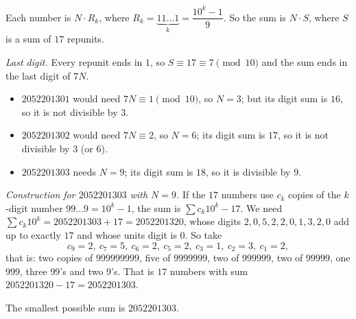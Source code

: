Each number is $N\cdot R_k$, where $R_k=\underbrace{11\ldots1}_{k}=\dfrac{10^k-1}{9}$. So the sum is $N\cdot S$, where $S$ is a sum of $17$ repunits.

\emph{Last digit.} Every repunit ends in $1$, so $S\equiv17\equiv7\pmod{10}$ and the sum ends in the last digit of $7N$.
\begin{itemize}
\item $2052201301$ would need $7N\equiv1\pmod{10}$, so $N=3$; but its digit sum is $16$, so it is not divisible by $3$.
\item $2052201302$ would need $7N\equiv2$, so $N=6$; its digit sum is $17$, so it is not divisible by $3$ (or $6$).
\item $2052201303$ needs $N=9$; its digit sum is $18$, so it is divisible by $9$.
\end{itemize}
\emph{Construction for $2052201303$ with $N=9$.} If the $17$ numbers use $c_k$ copies of the $k$-digit number $99\ldots9=10^k-1$, the sum is $\sum c_k10^k-17$. We need $\sum c_k10^k=2052201303+17=2052201320$, whose digits $2,0,5,2,2,0,1,3,2,0$ add up to exactly $17$ and whose units digit is $0$. So take
\[
c_{9}=2,\ c_{7}=5,\ c_{6}=2,\ c_{5}=2,\ c_{3}=1,\ c_{2}=3,\ c_{1}=2,
\]
that is: two copies of $999999999$, five of $9999999$, two of $999999$, two of $99999$, one $999$, three $99$'s and two $9$'s. That is $17$ numbers with sum $2052201320-17=2052201303$.

The smallest possible sum is $\boxed{2052201303}$.
